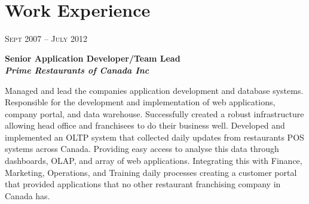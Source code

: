 \documentclass[9pt]{article} %
\begin{document}
\color{text1} %


\par{\\ %

\begin{minipage}[t]{0.5\textwidth} %
\vspace{0pt} %
	

\section{Work Experience} 


{\raggedleft\textsc{Sept 2007 -- July 2012}\par}

{\raggedright\bf Senior Application Developer/Team Lead\\
{\it Prime Restaurants of Canada Inc}\\}

\normalsize{Managed and lead the companies application development and database systems. Responsible for the development and implementation of web applications, company portal, and data warehouse. Successfully created a robust infrastructure allowing head office and franchisees to do their business well. Developed and implemented an OLTP system that collected daily updates from restaurants POS systems across Canada. Providing easy access to analyse this data through dashboards, OLAP, and array of web applications. Integrating this with Finance, Marketing, Operations, and Training daily processes creating a customer portal that provided applications that no other restaurant franchising company in Canada has.}\\


\end{minipage}}
\end{document}
